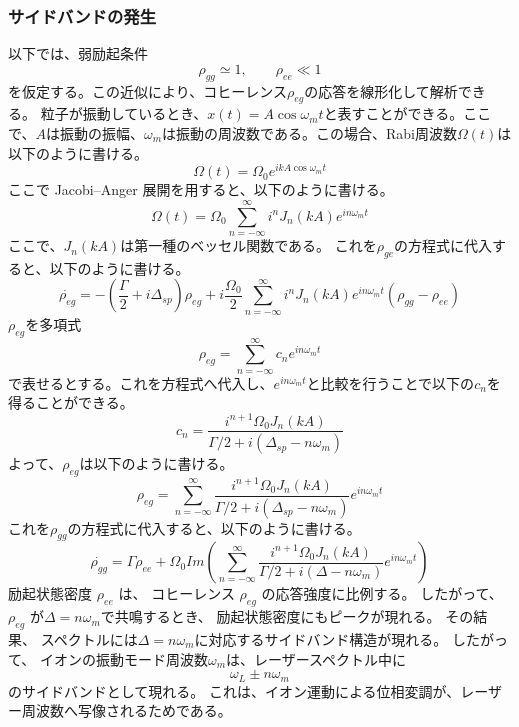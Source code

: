 \subsubsection{サイドバンドの発生}
    以下では、弱励起条件
\[
    \rho_{gg}\simeq1,
    \qquad
    \rho_{ee}\ll1
\]
    を仮定する。この近似により、コヒーレンス$\rho_{eg}$の応答を線形化して解析できる。
    粒子が振動しているとき、$x(t) = A\cos\omega_m t$と表すことができる。ここで、$A$は振動の振幅、$\omega_m$は振動の周波数である。この場合、Rabi周波数$\Omega(t)$は以下のように書ける。
    \begin{equation}
    \Omega(t) = \Omega_0 e^{ikA\cos\omega_m t}
    \end{equation}
    ここで Jacobi–Anger 展開を用すると、以下のように書ける。
    \begin{equation}
    \Omega(t) = \Omega_0 \sum_{n=-\infty}^{\infty} i^n J_n(kA) e^{in\omega_m t}
    \end{equation}
    ここで、$J_n(kA)$は第一種のベッセル関数である。
    これを$\rho_{ge}$の方程式に代入すると、以下のように書ける。
    \begin{equation}
    \dot{\rho_{eg}} = -(\frac{\Gamma}{2} + i\Delta_{sp})\rho_{eg} + i\frac{\Omega_0}{2} \sum_{n=-\infty}^{\infty} i^n J_n(kA) e^{in\omega_m t} (\rho_{gg}-\rho_{ee})
    \end{equation}
    $\rho_{eg}$を多項式
    \begin{equation}
        \rho_{eg}=\sum_{n=-\infty}^{\infty}
        c_n e^{in\omega_m t}
    \end{equation}
    で表せるとする。これを方程式へ代入し、$e^{in\omega_m t}$と比較を行うことで以下の$c_n$を得ることができる。
    \begin{equation}
        c_n=\frac{i^{n+1}\Omega_0 J_n(kA)}{\Gamma/2+i(\Delta_{sp}-n\omega_m)}
    \end{equation}
    よって、$\rho_{eg}$は以下のように書ける。
    \begin{equation}
    \rho_{eg} = \sum_{n=-\infty}^{\infty} \frac{i^{n+1} \Omega_0 J_n(kA)}{\Gamma/2 + i(\Delta_{sp} - n\omega_m)} e^{in\omega_m t}
    \end{equation}
    これを$\rho_{gg}$の方程式に代入すると、以下のように書ける。
    \begin{equation}
    \dot{\rho_{gg}} = \Gamma \rho_{ee} + \Omega_0 Im\left( \sum_{n=-\infty}^{\infty} \frac{i^{n+1} \Omega_0 J_n(kA)}{\Gamma/2 + i(\Delta - n\omega_m)} e^{in\omega_m t} \right)
    \end{equation}励起状態密度 $\rho_{ee}$ は、 コヒーレンス $\rho_{eg}$ の応答強度に比例する。
    したがって、$\rho_{eg}$ が$\Delta=n\omega_m$で共鳴するとき、 励起状態密度にもピークが現れる。 その結果、 スペクトルには$\Delta=n\omega_m$に対応するサイドバンド構造が現れる。
したがって、
イオンの振動モード周波数$\omega_m$は、レーザースペクトル中に\[
    \omega_L \pm n\omega_m
\]のサイドバンドとして現れる。
これは、イオン運動による位相変調が、レーザー周波数へ写像されるためである。